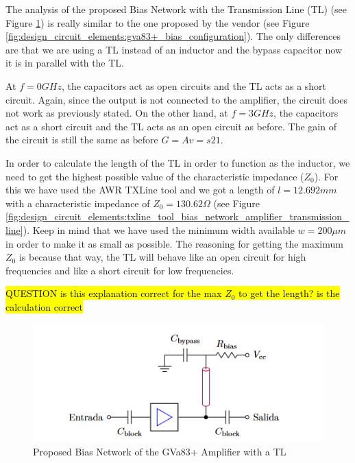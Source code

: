 \documentclass[12pt]{report} %
\newcommand{\question}[1]{\sethlcolor{red}\hl{QUESTION #1}}
\begin{document}
The analysis of the proposed Bias Network with the Transmission Line (TL) (see Figure \ref{fig:design_circuit_elements:gva83+_bias_transmission_line}) is really similar to the one proposed by the vendor (see Figure \ref{fig:design_circuit_elements:gva83+_bias_configuration}). The only differences are that we are using a TL instead of an inductor and the bypass capacitor now it is in parallel with the TL.

At $f = 0 GHz$, the capacitors act as open circuits and the TL acts as a short circuit. Again, since the output is not connected to the amplifier, the circuit does not work as previously stated. On the other hand, at $f = 3 GHz$, the capacitors act as a short circuit and the TL acts as an open circuit as before. The gain of the circuit is still the same as before $G = Av = s{21}$.

In order to calculate the length of the TL in order to function as the inductor, we need to get the highest possible value of the characteristic impedance ($Z_0$). For this we have used the AWR TXLine tool and we got a length of $l = 12.692 mm$ with a characteristic impedance of $Z_0 = 130.62 \Omega$ (see Figure \ref{fig:design_circuit_elements:txline_tool_bias_network_amplifier_transmission_line}). Keep in mind that we have used the minimum width available $w = 200 \mu m$ in order to make it as small as possible. The reasoning for getting the maximum $Z_0$ is because that way, the TL will behave like an open circuit for high frequencies and like a short circuit for low frequencies.

\question{is this explanation correct for the max $Z_0$ to get the length? is the calculation correct}

\begin{figure}[htbp]
    \centering
    \includegraphics[width=\textwidth]{images/design_circuit_elements/gva83+_bias_transmission_line.png}
    \caption{Proposed Bias Network of the GVa83+ Amplifier with a TL}
    \label{fig:design_circuit_elements:gva83+_bias_transmission_line}
\end{figure}
\end{document}
